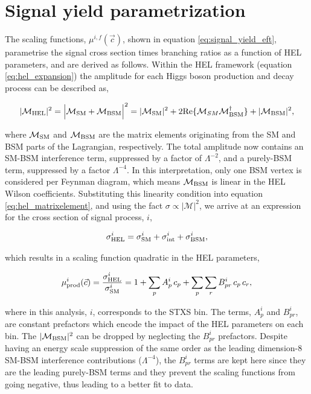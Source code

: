\newpage
\section{Signal yield parametrization}\label{sec:eft_parametrisation}
The scaling functions, $\mu^{i,f}(\vec{c})$, shown in equation \ref{eq:signal_yield_eft}, parametrise the signal cross section times branching ratios as a function of HEL parameters, and are derived as follows. Within the HEL framework (equation \ref{eq:hel_expansion}) the amplitude for each Higgs boson production and decay process can be described as,

\begin{equation}\label{eq:hel_matrixelement}
    |\mathcal{M}_{\rm{HEL}}|^2 = \Big| \mathcal{M}_{\rm{SM}} + \mathcal{M}_{\rm{BSM}} \Big|^2 = |\mathcal{M}_{\rm{SM}}|^2 + 2{\rm{Re}}\{\mathcal{M}_{SM}\mathcal{M}^{\dagger}_{\rm{BSM}}\} + |\mathcal{M}_{\rm{BSM}}|^2,
\end{equation}

\noindent
where $\mathcal{M}_{\rm{SM}}$ and $\mathcal{M}_{\rm{BSM}}$ are the matrix elements originating from the SM and BSM parts of the Lagrangian, respectively. The total amplitude now contains an SM-BSM interference term, suppressed by a factor of $\Lambda^{-2}$, and a purely-BSM term, suppressed by a factor $\Lambda^{-4}$. In this interpretation, only one BSM vertex is considered per Feynman diagram, which means $\mathcal{M}_{\rm{BSM}}$ is linear in the HEL Wilson coefficients. Substituting this linearity condition into equation \ref{eq:hel_matrixelement}, and using the fact $\sigma \propto |\mathcal{M}|^2$, we arrive at an expression for the cross section of signal process, $i$,

\begin{equation}
    \sigma^i_{\rm{HEL}} = \sigma^i_{\rm{SM}} + \sigma^i_{\rm{int}} + \sigma^i_{\rm{BSM}},
\end{equation}

\noindent
which results in a scaling function quadratic in the HEL parameters,

\begin{equation}
    \mu^i_{\rm{prod}}(\vec{c}) = \frac{\sigma^i_{\rm{HEL}}}{\sigma^i_{\rm{SM}}} = 1 + \sum_p A^i_p\,c_p + \sum_p \sum_r B^i_{pr}\,c_p\,c_r,
\end{equation}

\noindent
where in this analysis, $i$, corresponds to the STXS bin. The terms, $A^i_p$ and $B^i_{pr}$, are constant prefactors which encode the impact of the HEL parameters on each bin. The $|\mathcal{M}_{\rm{BSM}}|^2$ can be dropped by neglecting the $B^i_{pr}$ prefactors. Despite having an energy scale suppression of the same order as the leading dimension-8 SM-BSM interference contributions ($\Lambda^{-4}$), the $B^i_{pr}$ terms are kept here since they are the leading purely-BSM terms and they prevent the scaling functions from going negative, thus leading to a better fit to data.

